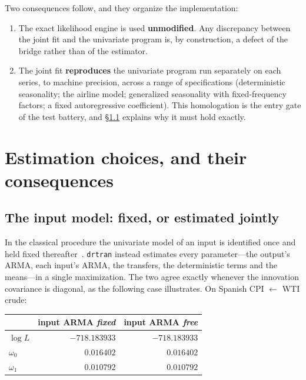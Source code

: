 \documentclass[11pt,a4paper]{article}
\theoremstyle{plain}
\theoremstyle{remark}
\begin{document}
Two consequences follow, and they organize the implementation:

\begin{enumerate}
\item The exact likelihood engine is used \textbf{unmodified}. Any discrepancy
  between the joint fit and the univariate program is, by construction, a defect
  of the bridge rather than of the estimator.
\item The joint fit \textbf{reproduces} the univariate program run separately on
  each series, to machine precision, across a range of specifications
  (deterministic seasonality; the airline model; generalized seasonality with
  fixed-frequency factors; a fixed autoregressive coefficient). This homologation
  is the entry gate of the test battery, and \S\ref{sec:separability} explains why
  it must hold exactly.
\end{enumerate}

\section{Estimation choices, and their consequences}

\subsection{The input model: fixed, or estimated jointly}
\label{sec:separability}

In the classical procedure the univariate model of an input is identified once and
held fixed thereafter~\cite[chs.~10--11]{bjr1994}. \texttt{drtran} instead
estimates every parameter---the output's ARMA, each input's ARMA, the transfers,
the deterministic terms and the means---in a single maximization. The two agree
exactly whenever the innovation covariance is diagonal, as the following case
illustrates. On Spanish CPI $\leftarrow$ WTI crude:

\begin{center}
\begin{tabular}{lrr}
\toprule
 & input ARMA \emph{fixed} & input ARMA \emph{free} \\
\midrule
$\log L$   & $-718.183933$ & $-718.183933$ \\
$\omega_0$ & $0.016402$    & $0.016402$ \\
$\omega_1$ & $0.010792$    & $0.010792$ \\
\bottomrule
\end{tabular}
\end{center}
\end{document}
